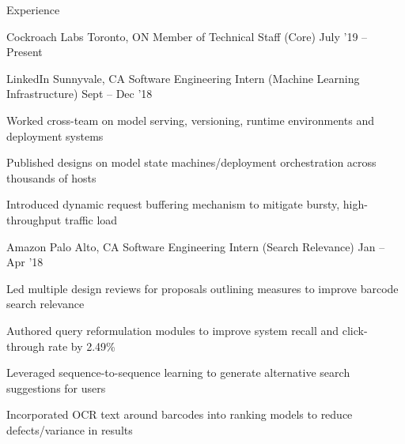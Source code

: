 \documentclass{resume} %
\begin{document}
\begin{rSection}{Experience}
  \begin{rEmptyWorkSection}{Cockroach Labs}
                           {Toronto, ON}
                           {Member of Technical Staff (Core)}
                           {July '19 -- Present}
  \end{rEmptyWorkSection}

  \begin{rWorkSection}{LinkedIn}
                      {Sunnyvale, CA}
                      {Software Engineering Intern (Machine Learning Infrastructure)}
                      {Sept -- Dec '18}
  {
    \item Worked cross-team on model serving, versioning, runtime environments and
      deployment systems
    \item Published designs on model state
      machines/deployment orchestration across thousands of hosts
    \item Introduced dynamic request buffering mechanism to mitigate bursty,
      high-throughput traffic load
  }
  \end{rWorkSection}

  \begin{rWorkSection}{Amazon}
                     {Palo Alto, CA}
                     {Software Engineering Intern (Search Relevance)}
                     {Jan -- Apr '18}
  {
    \item Led multiple design reviews for proposals outlining measures to
      improve barcode search relevance
    \item Authored query reformulation modules to improve system recall and
      click-through rate by 2.49\%
    \item Leveraged sequence-to-sequence learning to generate alternative
      search suggestions for users
    \item Incorporated OCR text around barcodes into ranking models to reduce
      defects/variance in results
  }
  \end{rWorkSection}


\end{rSection}
\end{document}
